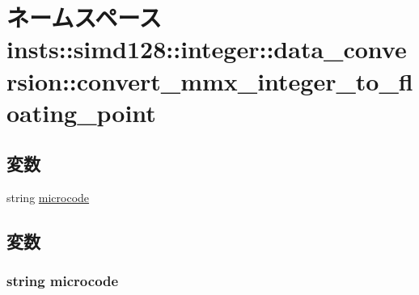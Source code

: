 \hypertarget{namespaceinsts_1_1simd128_1_1integer_1_1data__conversion_1_1convert__mmx__integer__to__floating__point}{
\section{ネームスペース insts::simd128::integer::data\_\-conversion::convert\_\-mmx\_\-integer\_\-to\_\-floating\_\-point}
\label{namespaceinsts_1_1simd128_1_1integer_1_1data__conversion_1_1convert__mmx__integer__to__floating__point}
}
\subsection*{変数}
\begin{DoxyCompactItemize}
\item 
string \hyperlink{namespaceinsts_1_1simd128_1_1integer_1_1data__conversion_1_1convert__mmx__integer__to__floating__point_a770f11a173e99389a8802f0107ed8f52}{microcode}
\end{DoxyCompactItemize}


\subsection{変数}
\hypertarget{namespaceinsts_1_1simd128_1_1integer_1_1data__conversion_1_1convert__mmx__integer__to__floating__point_a770f11a173e99389a8802f0107ed8f52}{
\subsubsection[{microcode}]{\setlength{\rightskip}{0pt plus 5cm}string {\bf microcode}}}
\label{namespaceinsts_1_1simd128_1_1integer_1_1data__conversion_1_1convert__mmx__integer__to__floating__point_a770f11a173e99389a8802f0107ed8f52}
